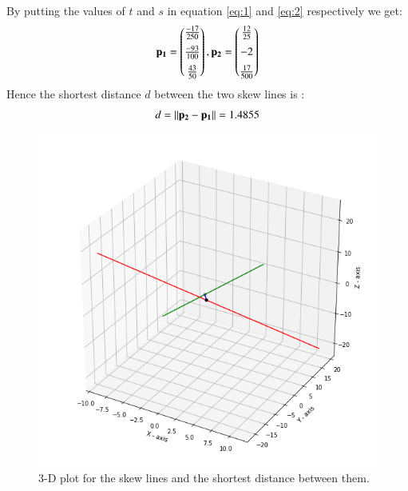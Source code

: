 \documentclass[journal,12pt,twocolumn]{IEEEtran}
\begin{document}
By putting the values of $t$ and $s$ in equation \eqref{eq:1} and \eqref{eq:2} respectively we get:
\begin{align}
    \mathbf{p_1}=\begin{pmatrix}\frac{-17}{250}\\[0.2cm]\frac{-93}{100}\\[0.2cm]\frac{43}{50}\end{pmatrix},\mathbf{p_2}=\begin{pmatrix}\frac{12}{25}\\[0.2cm]-2\\[0.2cm]\frac{17}{500}\end{pmatrix}
\end{align}
Hence the shortest distance $d$ between the two skew lines is :
\begin{align}
d=\left\lVert\mathbf{p_2}-\mathbf{p_1}\right\rVert=1.4855
\end{align}
\begin{figure}[h]
\centering
    \includegraphics[width=\columnwidth]{assignment2.png}
    \caption{3-D plot for the skew lines and the shortest distance between them.}
    \label{skew_lines}
\end{figure}
\end{document}
